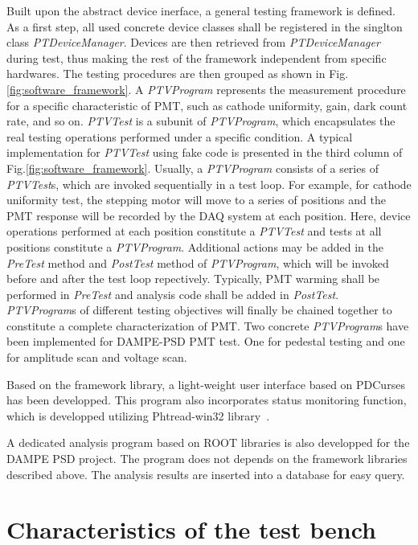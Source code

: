 \documentclass[5p, times]{elsarticle}
\begin{document}
Built upon the abstract device inerface, a general testing framework is defined.
As a first step, all used concrete device classes shall be registered in the singlton class \textit{PTDeviceManager}.
Devices are then retrieved from \textit{PTDeviceManager} during test, thus making the rest of the framework independent from specific hardwares.
The testing procedures are then grouped as shown in Fig.\ref{fig:software_framework}.
A \textit{PTVProgram} represents the measurement procedure for a specific characteristic of PMT, such as cathode uniformity, gain, dark count rate, and so on.
\textit{PTVTest} is a subunit of \textit{PTVProgram}, which encapsulates the real testing operations performed under a specific condition.
A typical implementation for \textit{PTVTest} using fake code is presented in the third column of Fig.\ref{fig:software_framework}.
Usually, a \textit{PTVProgram} consists of a series of \textit{PTVTest}s, which are invoked sequentially in a test loop.
For example, for cathode uniformity test, the stepping motor will move to a series of positions and the PMT response will be recorded by the DAQ system at each position.
Here, device operations performed at each position constitute a \textit{PTVTest} and tests at all positions constitute a \textit{PTVProgram}.
Additional actions may be added in the \textit{PreTest} method and \textit{PostTest} method of \textit{PTVProgram}, which will be invoked before and after the test loop repectively.
Typically, PMT warming shall be performed in \textit{PreTest} and analysis code shall be added in \textit{PostTest}.
\textit{PTVProgram}s of different testing objectives will finally be chained together to constitute a complete characterization of PMT.
Two concrete \textit{PTVProgram}s have been implemented for DAMPE-PSD PMT test.
One for pedestal testing and one for amplitude scan and voltage scan.

Based on the framework library, a light-weight user interface based on PDCurses~\cite{pdcurses} has been developped.
This program also incorporates status monitoring function, which is developped utilizing Phtread-win32 library~\cite{pthread_win32}.

A dedicated analysis program based on ROOT libraries is also developped for the DAMPE PSD project.
The program does not depends on the framework libraries described above.
The analysis results are inserted into a database for easy query.
\section{Characteristics of the test bench}
\label{sec:char_testbench}
\end{document}
